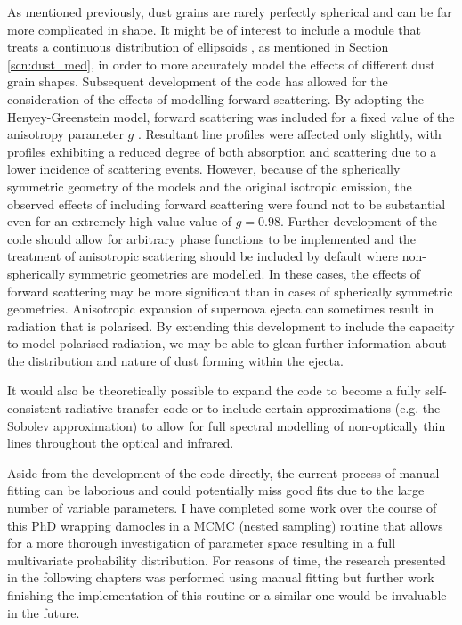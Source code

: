 As mentioned previously, dust grains are rarely perfectly spherical and can be far more complicated in shape.  It might be of interest to include a module that treats a continuous distribution of ellipsoids  \citep{Bohren1983}, as mentioned in Section \ref{scn:dust_med}, in order to more accurately model the effects of different dust grain shapes.
%
Subsequent development of the code has allowed for the consideration of the effects of modelling forward scattering.  By adopting the Henyey-Greenstein model, forward scattering was included for a fixed value of the anisotropy parameter $g$ \citep{Henyey1941}.  Resultant line profiles were affected only slightly, with profiles exhibiting a reduced degree of both absorption and scattering due to a lower incidence of scattering events.  However, because of the spherically symmetric geometry of the models and the original isotropic emission, the observed effects of including forward scattering were found not to be substantial even for an extremely high value value of $g = 0.98$.  Further development of the code should allow for arbitrary phase functions to be implemented and the treatment of anisotropic scattering should be included by default where non-spherically symmetric geometries are modelled.  In these cases, the effects of forward scattering may be more significant than in cases of spherically symmetric geometries.  Anisotropic expansion of supernova ejecta can sometimes result in radiation that is polarised.  By extending this development to include the capacity to model polarised radiation, we may be able to glean further information about the distribution and nature of dust forming within the ejecta.  

It would also be theoretically possible to expand the code to become a fully self-consistent radiative transfer code or to include certain approximations (e.g. the Sobolev approximation) to allow for full spectral modelling of non-optically thin lines throughout the optical and infrared.

Aside from the development of the code directly, the current process of manual fitting can be laborious and could potentially miss good fits due to the large number of variable parameters.  I have completed some work over the course of this PhD wrapping {\sc damocles} in a MCMC (nested sampling) routine that allows for a more thorough investigation of parameter space resulting in a full multivariate probability distribution.  For reasons of time, the research presented in the following chapters was performed using manual fitting but further work finishing the implementation of this routine or a similar one would be invaluable in the future.





